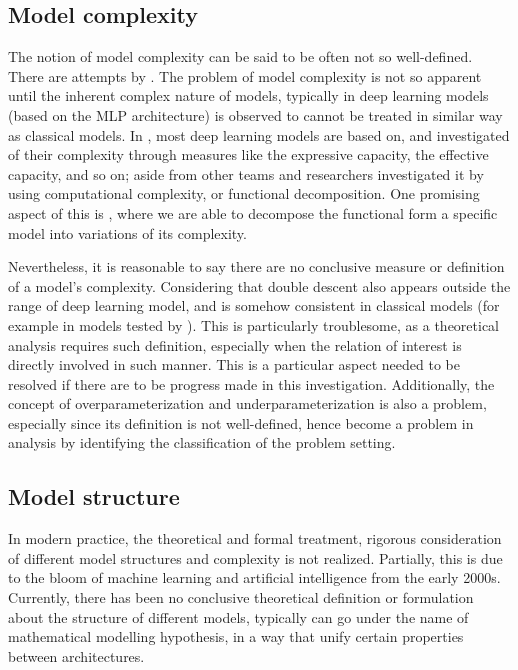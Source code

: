 \documentclass[twoside,10pt]{article}
\begin{document}
\subsection{Model complexity}
The notion of model complexity can be said to be often not so well-defined. There are attempts by \cite{hu2021modelcomplexitydeeplearning,luo2024investigatingimpactmodelcomplexity,barceló2020modelinterpretabilitylenscomputational,Molnar_2020,janik2021complexitydeepneuralnetworks}. The problem of model complexity is not so apparent until the inherent complex nature of models, typically in deep learning models (based on the MLP architecture) is observed to cannot be treated in similar way as classical models. In \cite{hu2021modelcomplexitydeeplearning}, most deep learning models are based on, and investigated of their complexity through measures like the expressive capacity, the effective capacity, and so on; aside from other teams and researchers investigated it by using computational complexity, or functional decomposition. One promising aspect of this is \cite{Molnar_2020}, where we are able to decompose the functional form a specific model into variations of its complexity. 

Nevertheless, it is reasonable to say there are no conclusive measure or definition of a model's complexity. Considering that double descent also appears outside the range of deep learning model, and is somehow consistent in classical models (for example in models tested by \cite{belkin_reconciling_2019}). This is particularly troublesome, as a theoretical analysis requires such definition, especially when the relation of interest is directly involved in such manner. This is a particular aspect needed to be resolved if there are to be progress made in this investigation. Additionally, the concept of overparameterization and underparameterization is also a problem, especially since its definition is not well-defined, hence become a problem in analysis by identifying the classification of the problem setting. 
\subsection{Model structure}

In modern practice, the theoretical and formal treatment, rigorous consideration of different model structures and complexity is not realized. Partially, this is due to the bloom of machine learning and artificial intelligence from the early 2000s. Currently, there has been no conclusive theoretical definition or formulation about the structure of different models, typically can go under the name of mathematical modelling hypothesis, in a way that unify certain properties between architectures. 
\end{document}
